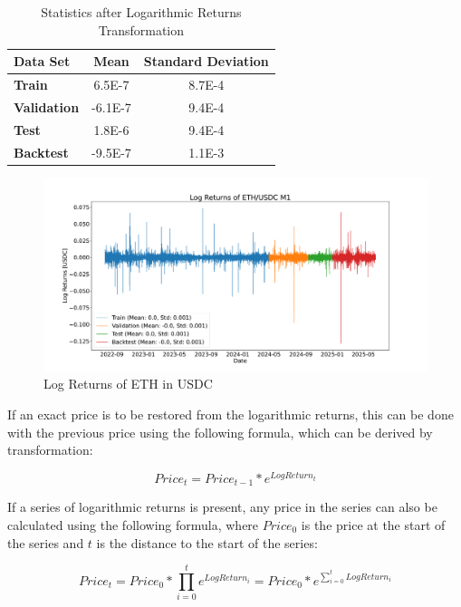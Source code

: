 \begin{table}[H]
    \centering
    \begin{tabular}{L{3cm}cc}
        \toprule
        \textbf{Data Set}   & Mean    & Standard Deviation \\
        \midrule
        \textbf{Train}      & 6.5E-7  & 8.7E-4             \\
        \textbf{Validation} & -6.1E-7 & 9.4E-4             \\
        \textbf{Test}       & 1.8E-6  & 9.4E-4             \\
        \textbf{Backtest}   & -9.5E-7 & 1.1E-3             \\
        \bottomrule
    \end{tabular}
    \caption{Statistics after Logarithmic Returns Transformation}
    \label{tbl:stat-log-returns}
\end{table}

\begin{figure}[H]
    \centering
    \includegraphics[width=\textwidth]{images/eda/log_returns_ethusdc}
    \caption{Log Returns of ETH in USDC}
    \label{fig:eth-log-data}
\end{figure}

\noindent
If an exact price is to be restored from the logarithmic returns, this can be done with the previous price using the following formula, which can be derived by transformation:

\[
    Price_t = Price_{t-1} * e^{LogReturn_t}
\]

\noindent
If a series of logarithmic returns is present, any price in the series can also be calculated using the following formula, where $Price_{0}$ is the price at the start of the series and $t$ is the distance to the start of the series:

\[
    Price_t = Price_0 * \prod_{i=0}^{t} e^{LogReturn_{i}} = Price_0 * e^{\sum_{i=0}^{t} LogReturn_i}
\]

